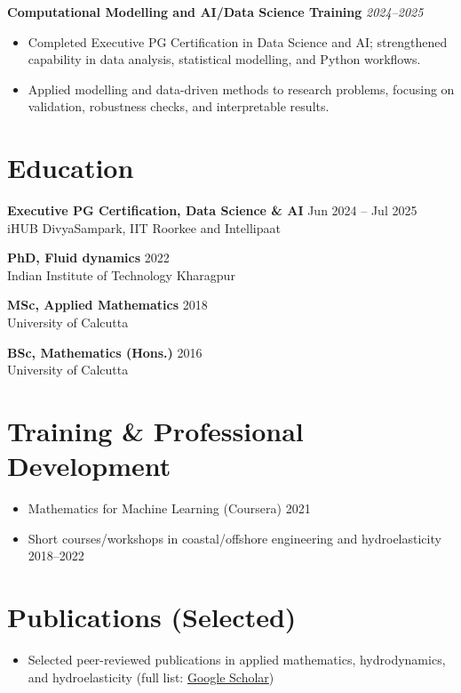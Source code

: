 \documentclass[10pt,a4paper]{article}
\newcommand{\cvline}[2]{\textbf{#1} \hfill #2}
\newcommand{\tightsep}{\vspace{2pt}}
\begin{document}
\textbf{Computational Modelling and AI/Data Science Training} \hfill \textit{2024--2025}
\begin{itemize}
  \item Completed Executive PG Certification in Data Science and AI; strengthened capability in data analysis, statistical modelling, and Python workflows.
  \item Applied modelling and data-driven methods to research problems, focusing on validation, robustness checks, and interpretable results.
\end{itemize}
\section*{Education}
\cvline{Executive PG Certification, Data Science \& AI}{Jun 2024 -- Jul 2025}\\
iHUB DivyaSampark, IIT Roorkee and Intellipaat

\tightsep
\cvline{PhD, Fluid dynamics}{2022}\\
Indian Institute of Technology Kharagpur

\tightsep
\cvline{MSc, Applied Mathematics}{2018}\\
University of Calcutta

\tightsep
\cvline{BSc, Mathematics (Hons.)}{2016}\\
University of Calcutta

\section*{Training \& Professional Development}
\begin{itemize}
  \item Mathematics for Machine Learning (Coursera) \hfill 2021
  \item Short courses/workshops in coastal/offshore engineering and hydroelasticity \hfill 2018--2022
\end{itemize}

\section*{Publications (Selected)}
\begin{itemize}
  \item Selected peer-reviewed publications in applied mathematics, hydrodynamics, and hydroelasticity (full list: \href{https://scholar.google.com/citations?user=lxZzGV8AAAAJ&hl=en}{Google Scholar})
\end{itemize}
\end{document}
